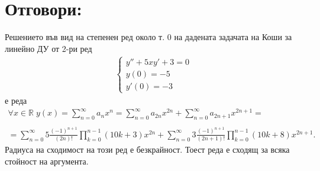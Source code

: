 \documentclass[a4paper,14pt]{extarticle}
\newcommand{\R}{\mathbb{R}}
\begin{document}
\section*{Отговори:}
Решението във вид на степенен ред около т. $0$ на дадената задачата на Коши за линейно ДУ от 2-ри ред
\begin{align*}
    \begin{cases}
        y'' + 5xy' + 3 = 0 \\
        y(0) = -5 \\
        y'(0) = -3
    \end{cases}
\end{align*} е реда
\begin{align*}
    \forall x \in \R \; y(x) = \displaystyle\sum_{n = 0}^\infty a_n x^n = \displaystyle\sum_{n = 0}^\infty a_{2n} x^{2n} + \displaystyle\sum_{n = 0}^\infty a_{2n + 1} x^{2n + 1} = \\\\
    = \displaystyle\sum_{n = 0}^\infty 5\frac{(-1)^{n + 1}}{(2n)!}\displaystyle\prod_{k = 0}^{n - 1}(10k + 3) x^{2n}
    + \displaystyle\sum_{n = 0}^\infty 3\frac{(-1)^{n + 1}}{(2n + 1)!}\displaystyle\prod_{k = 0}^{n - 1}(10k + 8) x^{2n + 1}.
\end{align*}
Радиуса на сходимост на този ред е безкрайност. Тоест реда е сходящ за всяка стойност на аргумента.
\end{document}
